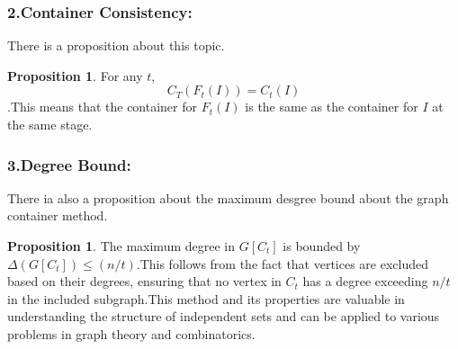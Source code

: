 \documentclass[preprint,11pt]{elsarticle}
\theoremstyle{definition}
\newtheorem{proposition}[theorem]{Proposition}
\begin{document}
\begin{multicols}{2}
\subsubsection*{2.Container Consistency:}There is a proposition about this topic.
\begin{proposition}
For any $t$,
\begin{equation*}
C_T(F_t(I))=C_t(I)
\end{equation*}.This means that the container for $F_t(I)$ is the same as the container for $I$ at the same stage.
\end{proposition}
\subsubsection*{3.Degree Bound:}There ia also a proposition about the maximum desgree bound about the graph container method.
\begin{proposition}
The maximum degree in $G[C_t]$ is bounded  by \\$\Delta(G[C_t])\leq (n/t)$.This follows from the fact that vertices are excluded based on their degrees, ensuring that no vertex in $C_t$ has a degree exceeding $n/t$ in the included subgraph.This method and its properties are valuable in understanding the structure of independent sets and can be applied to various problems in graph theory and combinatorics.
\end{proposition}

\end{multicols}
\end{document}
